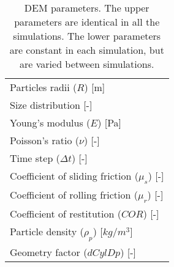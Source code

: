 \begin{table}[h]
\centering
\begin{tabular}{l}
\hline 
    Particles radii ($R$) [m]   \\ [5pt]

	Size distribution [-] \\ [5pt]

    Young's modulus ($E$) [Pa] \\ [5pt]

    Poisson's ratio ($\nu$) [-] \\ 
     Time step ($\Delta t$) [-] \\ [5pt]
        \hline
     Coefficient of sliding friction ($\mu_s$) [-] \\  [5pt]
    Coefficient of rolling friction ($\mu_r$) [-] \\ [5pt]
    Coefficient of restitution ($COR$) [-] \\ [5pt]
     Particle density ($\rho_p$) [$kg/m^3$] \\ [5pt]
    Geometry factor ($dCylDp$) [-] \\ [5pt]
   


\hline
\end{tabular}
\caption[DEM parameters]{DEM parameters. The upper parameters are
identical in all the simulations. The lower parameters are constant in each
simulation, but are varied between simulations.}
\label{tab:08DEMparameters}
\end{table}


